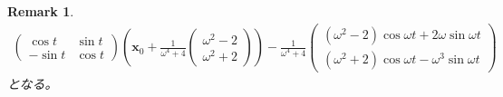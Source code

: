 \documentclass{jsarticle}
\newtheorem{remark}{Remark}
\begin{document}
\begin{remark}
\begin{align}
\begin{pmatrix}
\cos t & \sin t\\
-\sin t & \cos t
\end{pmatrix}\left(
\boldsymbol{x}_{0}
+\frac{1}{\omega^{4}+4}
\begin{pmatrix}
\omega^{2}-2\\
\omega^{2}+2
\end{pmatrix}
\right)
-\frac{1}{\omega^{4}+4}
\begin{pmatrix}
(\omega^{2}-2)\cos\omega t+2\omega\sin\omega t\\
(\omega^{2}+2)\cos\omega t-\omega^{3}\sin\omega t
\end{pmatrix}
\end{align}
となる。
\end{remark}
\end{document}
